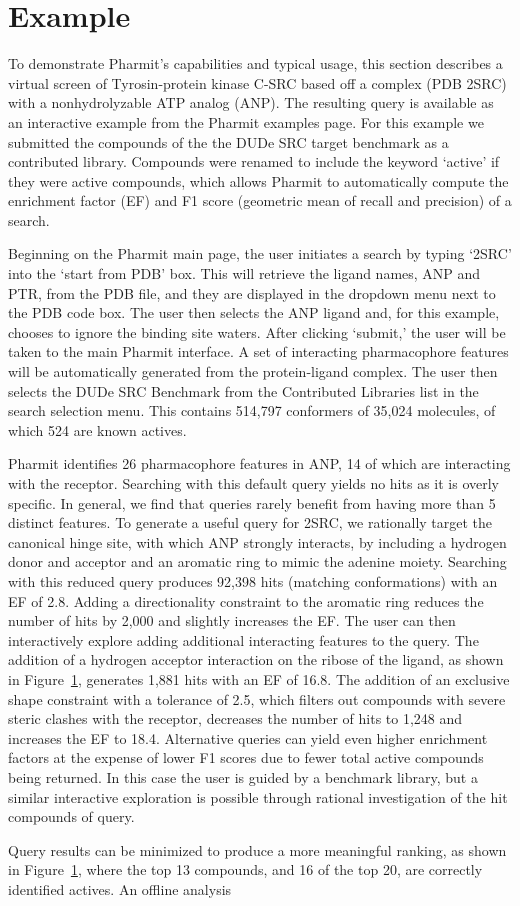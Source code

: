 \section{Example}

To demonstrate Pharmit's capabilities and typical usage, this section describes a virtual screen of Tyrosin-protein kinase C-SRC based off a complex (PDB 2SRC) with a nonhydrolyzable ATP analog (ANP). The resulting query is available as an interactive example from the Pharmit examples page.  For this example we submitted the compounds of the the DUDe \cite{Mysinger_2012} SRC target benchmark as a contributed library.  Compounds were renamed to include the keyword `active' if they were active compounds, which allows Pharmit to automatically compute the enrichment factor (EF) and F1 score (geometric mean of recall and precision) of a search.

  Beginning on the Pharmit main page, the user initiates a search by typing `2SRC' into the `start from PDB' box. This will retrieve the ligand names, ANP and PTR, from the PDB file, and they are displayed in the dropdown menu next to the PDB code box. The user then selects the ANP ligand and, for this example, chooses to ignore the binding site waters. After clicking `submit,' the user will be taken to the main Pharmit interface. A set of interacting pharmacophore features will be automatically generated from the protein-ligand complex.  The user then selects the DUDe SRC Benchmark from the Contributed Libraries list in the search selection menu.  This contains 514,797 conformers of 35,024 molecules, of which 524 are known actives.
  
  Pharmit identifies 26 pharmacophore features in ANP, 14 of which are interacting with the receptor.  Searching with this default query yields no hits as it is overly specific.  In general, we find that queries rarely benefit from having more than 5 distinct features.
  To generate a useful query for 2SRC, we rationally target the canonical hinge site, with which ANP strongly interacts, by including a hydrogen donor and acceptor and an aromatic ring to mimic the adenine moiety.  Searching with this reduced query produces 92,398 hits (matching conformations) with an EF of 2.8.  Adding a directionality constraint to the aromatic ring reduces the number of hits by 2,000 and slightly increases the EF.  The user can then interactively explore adding additional interacting features to the query.  The addition of a hydrogen acceptor interaction on the ribose of the ligand, as shown in Figure~\ref{}, generates 1,881 hits with an EF of 16.8.  The addition of an exclusive shape constraint with a tolerance of 2.5, which filters out compounds with severe steric clashes with the receptor, decreases the number of hits to 1,248 and increases the EF to 18.4. Alternative queries can yield even higher enrichment factors at the expense of lower F1 scores due to fewer total active compounds being returned.  In this case the user is guided by a benchmark library, but a similar interactive exploration is possible through rational investigation of the hit compounds of query.
  
Query results can be minimized to produce a more meaningful ranking, as shown in Figure~\ref{}, where the top 13 compounds, and 16 of the top 20, are correctly identified actives.  An offline analysis

  
